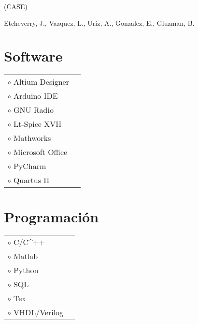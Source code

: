 \begin{adjustbox}{valign=t}
\begin{minipage}{0.60\textwidth}
\begin{description}
\item[ \textcolor{ColorOne}{Nov.2021}] 
	 (CASE) \Myskip
    \item Etcheverry, J., Vazquez, L., Uriz, A., Gonzalez, E., Gluzman, B.\MySkip
\end{description}

 
%
	

\begin{multicols}{2}
\section*{Software}
\begin{tabular}{ll}
\textcolor{ColorOne}{$\circ$}	Altium Designer     & \\
\textcolor{ColorOne}{$\circ$}	Arduino IDE 		& \\
\textcolor{ColorOne}{$\circ$}	GNU Radio 	        & \\
\textcolor{ColorOne}{$\circ$}	Lt-Spice XVII    	& \\
\textcolor{ColorOne}{$\circ$}	Mathworks 	        & \\
\textcolor{ColorOne}{$\circ$}	Microsoft Office 	& \\
\textcolor{ColorOne}{$\circ$}	PyCharm	            & \\
\textcolor{ColorOne}{$\circ$}	Quartus II        	& \\
\end{tabular}
\vfill\null \columnbreak 
\section*{Programación}
\begin{tabular}{ll}
\textcolor{ColorOne}{$\circ$}	C/C^{++}        & 
	\\

\textcolor{ColorOne}{$\circ$}	Matlab 	    	& 
	\\

\textcolor{ColorOne}{$\circ$}		Python    	&
		\\
\textcolor{ColorOne}{$\circ$}	SQL    	& 
	\\
\textcolor{ColorOne}{$\circ$}		Tex 	    & 
	\\
\textcolor{ColorOne}{$\circ$}	VHDL/Verilog 	& 
\end{tabular}
\end{multicols}
\end{minipage}
\end{adjustbox}

